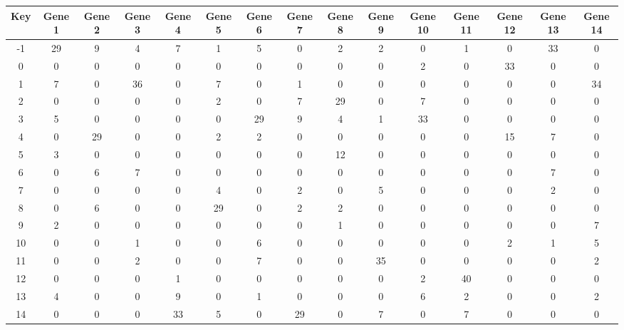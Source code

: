 \begin{tabular}{|c|c|c|c|c|c|c|c|c|c|c|c|c|c|c|}
\hline
Key & Gene 1 & Gene 2 & Gene 3 & Gene 4 & Gene 5 & Gene 6 & Gene 7 & Gene 8 & Gene 9 & Gene 10 & Gene 11 & Gene 12 & Gene 13 & Gene 14 \\
\hline
-1 & 29 & 9 & 4 & 7 & 1 & 5 & 0 & 2 & 2 & 0 & 1 & 0 & 33 & 0 \\
0 & 0 & 0 & 0 & 0 & 0 & 0 & 0 & 0 & 0 & 2 & 0 & 33 & 0 & 0 \\
1 & 7 & 0 & 36 & 0 & 7 & 0 & 1 & 0 & 0 & 0 & 0 & 0 & 0 & 34 \\
2 & 0 & 0 & 0 & 0 & 2 & 0 & 7 & 29 & 0 & 7 & 0 & 0 & 0 & 0 \\
3 & 5 & 0 & 0 & 0 & 0 & 29 & 9 & 4 & 1 & 33 & 0 & 0 & 0 & 0 \\
4 & 0 & 29 & 0 & 0 & 2 & 2 & 0 & 0 & 0 & 0 & 0 & 15 & 7 & 0 \\
5 & 3 & 0 & 0 & 0 & 0 & 0 & 0 & 12 & 0 & 0 & 0 & 0 & 0 & 0 \\
6 & 0 & 6 & 7 & 0 & 0 & 0 & 0 & 0 & 0 & 0 & 0 & 0 & 7 & 0 \\
7 & 0 & 0 & 0 & 0 & 4 & 0 & 2 & 0 & 5 & 0 & 0 & 0 & 2 & 0 \\
8 & 0 & 6 & 0 & 0 & 29 & 0 & 2 & 2 & 0 & 0 & 0 & 0 & 0 & 0 \\
9 & 2 & 0 & 0 & 0 & 0 & 0 & 0 & 1 & 0 & 0 & 0 & 0 & 0 & 7 \\
10 & 0 & 0 & 1 & 0 & 0 & 6 & 0 & 0 & 0 & 0 & 0 & 2 & 1 & 5 \\
11 & 0 & 0 & 2 & 0 & 0 & 7 & 0 & 0 & 35 & 0 & 0 & 0 & 0 & 2 \\
12 & 0 & 0 & 0 & 1 & 0 & 0 & 0 & 0 & 0 & 2 & 40 & 0 & 0 & 0 \\
13 & 4 & 0 & 0 & 9 & 0 & 1 & 0 & 0 & 0 & 6 & 2 & 0 & 0 & 2 \\
14 & 0 & 0 & 0 & 33 & 5 & 0 & 29 & 0 & 7 & 0 & 7 & 0 & 0 & 0 \\
\hline
\end{tabular}